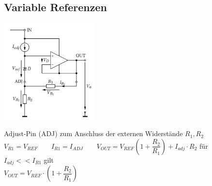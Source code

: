 \subsection{Variable Referenzen}
	\begin{minipage}{150pt}
		\includegraphics[width = 5cm]{./images/spgref/04_var_ref.png}
	\end{minipage}
	\begin{minipage}{300pt}
	Adjust-Pin (ADJ) zum Anschluss der externen Widerstände $R_1, R_2$\\
		$V_{R1} = V_{REF} \qquad I_{R1} = I_{ADJ} \qquad V_{OUT} = V_{REF}\left(1+\dfrac{R_2}{R_1}\right)+I_{adj}\cdot R_2$\newline
	für $I_{adj} << I_{R1}$ gilt\\
	$V_{OUT} = V_{REF}\cdot \left(1+\dfrac{R_2}{R_1}\right)$
	\end{minipage}	 
	
